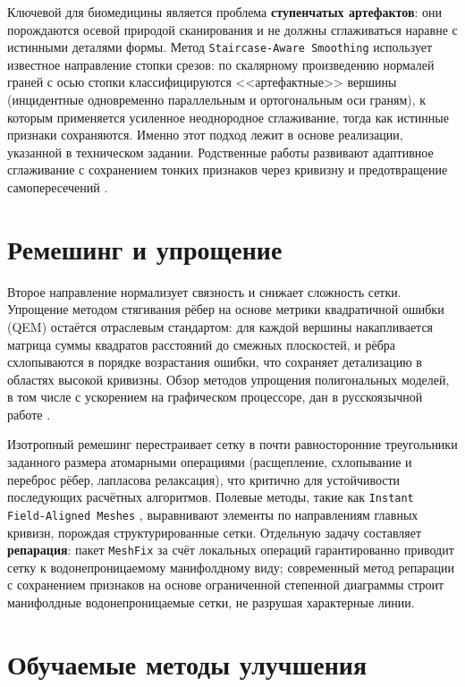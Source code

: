 \documentclass[a4paper,14pt]{article}
\begin{document}
Ключевой для биомедицины является проблема \textbf{ступенчатых артефактов}: они порождаются осевой природой сканирования и не должны сглаживаться наравне с истинными деталями формы. Метод \texttt{Staircase-Aware Smoothing} \cite{munch2010} использует известное направление стопки срезов: по скалярному произведению нормалей граней с осью стопки классифицируются <<артефактные>> вершины (инцидентные одновременно параллельным и ортогональным оси граням), к которым применяется усиленное неоднородное сглаживание, тогда как истинные признаки сохраняются. Именно этот подход лежит в основе реализации, указанной в техническом задании. Родственные работы развивают адаптивное сглаживание с сохранением тонких признаков через кривизну и предотвращение самопересечений \cite{wang2017}.

\section{Ремешинг и упрощение}

Второе направление нормализует связность и снижает сложность сетки. Упрощение методом стягивания рёбер на основе метрики квадратичной ошибки (QEM) \cite{garland1997} остаётся отраслевым стандартом: для каждой вершины накапливается матрица суммы квадратов расстояний до смежных плоскостей, и рёбра схлопываются в порядке возрастания ошибки, что сохраняет детализацию в областях высокой кривизны. Обзор методов упрощения полигональных моделей, в том числе с ускорением на графическом процессоре, дан в русскоязычной работе \cite{rus_gonahchyan}.

Изотропный ремешинг \cite{botsch2004} перестраивает сетку в почти равносторонние треугольники заданного размера атомарными операциями (расщепление, схлопывание и переброс рёбер, лапласова релаксация), что критично для устойчивости последующих расчётных алгоритмов. Полевые методы, такие как \texttt{Instant Field-Aligned Meshes} \cite{jakob2015}, выравнивают элементы по направлениям главных кривизн, порождая структурированные сетки. Отдельную задачу составляет \textbf{репарация}: пакет \texttt{MeshFix} \cite{attene2010} за счёт локальных операций гарантированно приводит сетку к водонепроницаемому манифолдному виду; современный метод репарации с сохранением признаков на основе ограниченной степенной диаграммы \cite{repair2025} строит манифолдные водонепроницаемые сетки, не разрушая характерные линии.

\section{Обучаемые методы улучшения}
\end{document}
